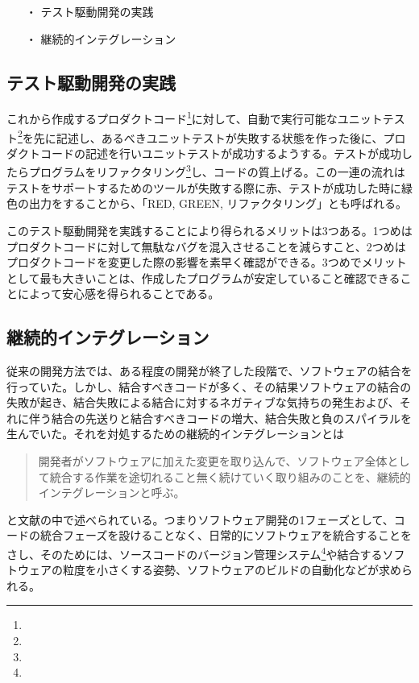 \begin{itemize}
 \item[・]テスト駆動開発の実践
 \item[・]継続的インテグレーション
\end{itemize}

\subsection{テスト駆動開発の実践}

これから作成するプロダクトコード\footnote{}に対して、自動で実行可能なユニットテスト\footnote{}を先に記述し、あるべきユニットテストが失敗する状態を作った後に、プロダクトコードの記述を行いユニットテストが成功するようする。テストが成功したらプログラムをリファクタリング\footnote{}し、コードの質上げる。この一連の流れはテストをサポートするためのツールが失敗する際に赤、テストが成功した時に緑色の出力をすることから、「RED, GREEN, リファクタリング」とも呼ばれる。

このテスト駆動開発を実践することにより得られるメリットは3つある。1つめはプロダクトコードに対して無駄なバグを混入させることを減らすこと、2つめはプロダクトコードを変更した際の影響を素早く確認ができる。3つめでメリットとして最も大きいことは、作成したプログラムが安定していること確認できることによって安心感を得られることである。

\subsection{継続的インテグレーション}


従来の開発方法では、ある程度の開発が終了した段階で、ソフトウェアの結合を行っていた。しかし、結合すべきコードが多く、その結果ソフトウェアの結合の失敗が起き、結合失敗による結合に対するネガティブな気持ちの発生および、それに伴う結合の先送りと結合すべきコードの増大、結合失敗と負のスパイラルを生んでいた。それを対処するための継続的インテグレーションとは

\begin{quote}

  開発者がソフトウェアに加えた変更を取り込んで、ソフトウェア全体として統合する作業を途切れること無く続けていく取り組みのことを、継続的インテグレーションと呼ぶ。

\end{quote}

と文献\cite{西村直人2011アジャイルサムライ}の中で述べられている。つまりソフトウェア開発の1フェーズとして、コードの統合フェーズを設けることなく、日常的にソフトウェアを統合することをさし、そのためには、ソースコードのバージョン管理システム\footnote{}や結合するソフトウェアの粒度を小さくする姿勢、ソフトウェアのビルドの自動化などが求められる。
